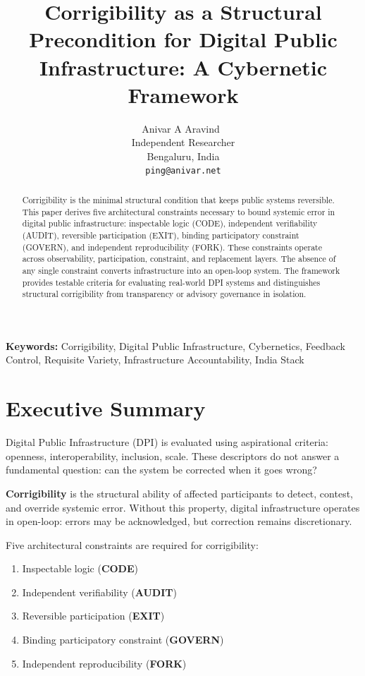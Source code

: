 \documentclass{article}
\title{Corrigibility as a Structural Precondition for Digital Public Infrastructure: A Cybernetic Framework}
\author{
  Anivar A Aravind~\orcidlink{0009-0009-8995-0005} \\
  Independent Researcher\\
  Bengaluru, India \\
  \texttt{ping@anivar.net}
}
\newenvironment{keywords}{\noindent\textbf{Keywords:} }{\par\medskip}
\begin{document}
\maketitle

\begin{abstract}
Corrigibility is the minimal structural condition that keeps public systems reversible. This paper derives five architectural constraints necessary to bound systemic error in digital public infrastructure: inspectable logic (CODE), independent verifiability (AUDIT), reversible participation (EXIT), binding participatory constraint (GOVERN), and independent reproducibility (FORK). These constraints operate across observability, participation, constraint, and replacement layers. The absence of any single constraint converts infrastructure into an open-loop system. The framework provides testable criteria for evaluating real-world DPI systems and distinguishes structural corrigibility from transparency or advisory governance in isolation.
\end{abstract}

\begin{keywords}
Corrigibility, Digital Public Infrastructure, Cybernetics, Feedback Control, Requisite Variety, Infrastructure Accountability, India Stack
\end{keywords}

\section*{Executive Summary}

Digital Public Infrastructure (DPI) is evaluated using aspirational criteria: openness, interoperability, inclusion, scale. These descriptors do not answer a fundamental question: can the system be corrected when it goes wrong?

\textbf{Corrigibility} is the structural ability of affected participants to detect, contest, and override systemic error. Without this property, digital infrastructure operates in open-loop: errors may be acknowledged, but correction remains discretionary.

Five architectural constraints are required for corrigibility:

\begin{enumerate}[noitemsep]
    \item Inspectable logic (\textbf{CODE})
    \item Independent verifiability (\textbf{AUDIT})
    \item Reversible participation (\textbf{EXIT})
    \item Binding participatory constraint (\textbf{GOVERN})
    \item Independent reproducibility (\textbf{FORK})
\end{enumerate}
\end{document}
